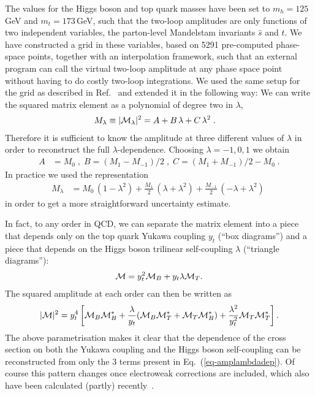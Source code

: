 The values for the Higgs boson and top quark masses have been set to
$m_h=125$\,GeV and $m_t=173$\,GeV, such that the two-loop amplitudes
are only functions of two independent variables, the parton-level Mandelstam invariants
$\hat{s}$ and $\hat{t}$.  We have constructed a grid in these
variables, based on 5291 pre-computed phase-space points, together with an interpolation framework, such that an
external program can call the virtual two-loop amplitude at any phase space
point without having to do costly two-loop integrations.
We used the same setup for the grid as described in Ref.~\cite{Heinrich:2017kxx} and extended it in the following way:
We can write the squared matrix element as a polynomial of degree two in $\lambda$, 
\begin{align}
M_\lambda& \equiv |{\cal M}_\lambda|^2=A+B\,\lambda + C\,\lambda^2\;. \label{eq-amplambdadep}
\end{align}
Therefore it is sufficient to know the amplitude at three different values of $\lambda$ in order to reconstruct the full $\lambda$-dependence. 
Choosing $\lambda=-1,0,1$ we obtain
\begin{align}
A&=M_0\;,\; B=(M_1-M_{-1})/2\;,\; C=(M_1+M_{-1})/2-M_0\;.
\end{align}
In practice we used the representation 
\begin{align}
M_\lambda &=M_0\,(1-\lambda^2)+\frac{M_1}{2}\,(\lambda+\lambda^2) + \frac{M_{-1}}{2}\,(-\lambda+\lambda^2)\;
\end{align}
in order to get a more straightforward uncertainty estimate.

In fact, to any order in QCD,  we can separate the matrix element into a 
piece that depends only on the top quark Yukawa coupling $y_t$ (``box diagrams'') and a 
piece that depends on the Higgs boson trilinear self-coupling $\lambda$ (``triangle diagrams''):
\begin{align}
{\cal M} = y_t^2 {\cal M}_B + y_t \lambda {\cal M}_T.
\end{align}
The squared amplitude at each order can then be written as
\begin{align}
|{\cal M}|^2 = y_t^4 \left[ {\cal M}_B {\cal M}_B^* + \frac{\lambda}{y_t} ({\cal M}_B {\cal M}_T^* + {\cal M}_T {\cal M}_B^* ) +  \frac{\lambda^2}{y_t^2} {\cal M}_T {\cal M}_T^*  \right].\label{eq:yt}
\end{align}
The above parametrisation makes it clear that the dependence of the cross section on
both the Yukawa coupling and the Higgs boson self-coupling can be reconstructed
from only the 3 terms present in Eq.~(\ref{eq-amplambdadep}).
Of course this pattern changes once electroweak corrections are
included, which also have been calculated (partly) recently~\cite{Bizon:2018syu,Borowka:2018pxx}. 

